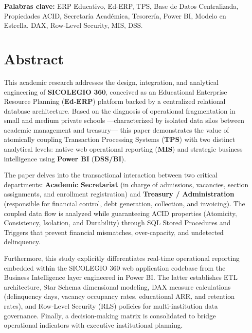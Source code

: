 \documentclass[12pt,a4paper,oneside]{report}
\begin{document}
\textbf{Palabras clave:} ERP Educativo, Ed-ERP, TPS, Base de Datos Centralizada, Propiedades ACID, Secretaría Académica, Tesorería, Power BI, Modelo en Estrella, DAX, Row-Level Security, MIS, DSS.

\chapter*{Abstract}

This academic research addresses the design, integration, and analytical engineering of \textbf{SICOLEGIO 360}, conceived as an Educational Enterprise Resource Planning (\textbf{Ed-ERP}) platform backed by a centralized relational database architecture. Based on the diagnosis of operational fragmentation in small and medium private schools —characterized by isolated data silos between academic management and treasury— this paper demonstrates the value of atomically coupling Transaction Processing Systems (\textbf{TPS}) with two distinct analytical levels: native web operational reporting (\textbf{MIS}) and strategic business intelligence using \textbf{Power BI} (\textbf{DSS/BI}).

The paper delves into the transactional interaction between two critical departments: \textbf{Academic Secretariat} (in charge of admissions, vacancies, section assignments, and enrollment registration) and \textbf{Treasury / Administration} (responsible for financial control, debt generation, collection, and invoicing). The coupled data flow is analyzed while guaranteeing ACID properties (Atomicity, Consistency, Isolation, and Durability) through SQL Stored Procedures and Triggers that prevent financial mismatches, over-capacity, and undetected delinquency.

Furthermore, this study explicitly differentiates real-time operational reporting embedded within the SICOLEGIO 360 web application codebase from the Business Intelligence layer engineered in Power BI. The latter establishes ETL architecture, Star Schema dimensional modeling, DAX measure calculations (delinquency days, vacancy occupancy rates, educational ARR, and retention rates), and Row-Level Security (RLS) policies for multi-institution data governance. Finally, a decision-making matrix is consolidated to bridge operational indicators with executive institutional planning.
\end{document}
